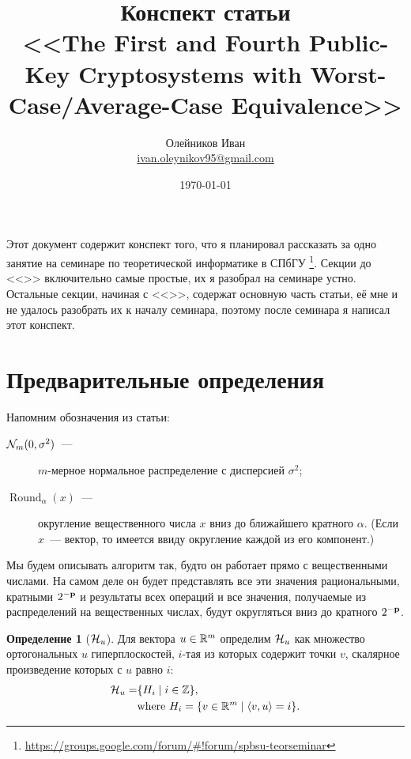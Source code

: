 \documentclass[oneside, a4paper]{article}
\theoremstyle{plain}
\theoremstyle{definition}
\newtheorem{defn}{Определение}
\theoremstyle{remark}
\newenvironment{definition}[1]{
\begin{defn}[#1]
}{
\end{defn}
}
\DeclareMathOperator{\round}{Round}
\newcommand\p{\ensuremath \mathbf p}
\newcommand\N{\ensuremath \mathcal N}
\newcommand\R{\ensuremath \mathbb R}
\newcommand\Z{\ensuremath \mathbb Z}
\newcommand\HH{\ensuremath \operatorname{\mathcal H}}
\DeclarePairedDelimiter\ang{\langle}{\rangle}
\begin{document}
\title{Конспект статьи \\ \foreignlanguage{english}{<<The First and Fourth Public-Key Cryptosystems
with Worst-Case/Average-Case Equivalence>>  \cite{ajtaidwork}}}
\author{Олейников Иван \\ \url{ivan.oleynikov95@gmail.com}}
\date{\today}
\maketitle

Этот документ содержит конспект того, что я планировал рассказать
за одно занятие на семинаре по теоретической информатике в СПбГУ
\footnote{\url{https://groups.google.com/forum/\#!forum/spbsu-teorseminar}}.
Секции до <<>> включительно самые простые, их я разобрал на
семинаре устно.
Остальные секции, начиная с <<>>, содержат основную
часть статьи, её мне и не удалось разобрать их к началу семинара, поэтому после
семинара я написал этот конспект.

\tableofcontents

\section{Предварительные определения}

Напомним обозначения из статьи:
\begin{description}
  \item[$\N_m(0, \sigma^2)$~---] $m$-мерное нормальное распределение с дисперсией
  $\sigma^2$;

  \item[$\round_\alpha(x)$~---] округление вещественного числа $x$ вниз до
  ближайшего кратного $\alpha$. (Если $x$~--- вектор, то имеется ввиду
  округление каждой из его компонент.)
\end{description}

Мы будем описывать алгоритм так, будто он работает прямо с вещественными
числами. На самом деле он будет представлять все эти значения рациональными,
кратными $2^{-\p}$ и результаты всех операций и все значения, получаемые из
распределений на вещественных числах, будут округляться вниз до кратного
$2^{-\p}$.

\begin{definition}{$\HH_u$}
Для вектора $u \in \R^m$ определим $\HH_u$ как множество ортогональных $u$
гиперплоскостей, $i$-тая из которых содержит точки $v$, скалярное произведение
которых с $u$ равно $i$:
\[
\begin{aligned}
\HH_u = &\{H_i \mid i \in \Z \}, \\
&\text{where } H_i = \{v \in \R^m \mid \ang{v, u} = i\}.
\end{aligned}
\]
\end{definition}
\end{document}

